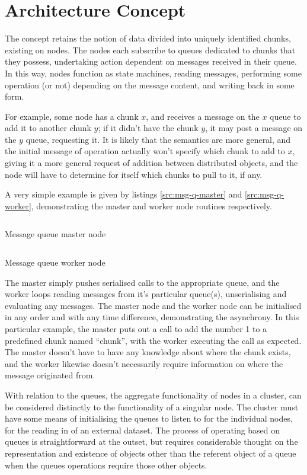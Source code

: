 \documentclass[a4paper,10pt]{article}
\begin{document}
\section{Architecture Concept}
The concept retains the notion of data divided into uniquely identified chunks,
existing on nodes.
The nodes each subscribe to queues dedicated to chunks that they possess,
undertaking action dependent on messages received in their queue.
In this way, nodes function as state machines, reading messages, performing
some operation (or not) depending on the message content, and writing back in
some form.

For example, some node has a chunk \(x\), and receives a message on the \(x\)
queue to add it to another chunk \(y\); if it didn't have the chunk \(y\), it
may post a message on the \(y\) queue, requesting it.
It is likely that the semantics are more general, and the initial message of
operation actually won't specify which chunk to add to \(x\), giving it a more
general request of addition between distributed objects, and the node will have
to determine for itself which chunks to pull to it, if any.

A very simple example is given by listings \ref{src:msg-q-master} and
\ref{src:msg-q-worker}, demonstrating the master and worker node routines
respectively.

\begin{listing}
\inputminted{r}{R/simple-msg-q-master.R}
	\caption{Message queue master node}
	\label{src:msg-q-master}
\end{listing}

\begin{listing}
\inputminted{r}{R/simple-msg-q-worker.R}
	\caption{Message queue worker node}
	\label{src:msg-q-worker}
\end{listing}

The master simply pushes serialised calls to the appropriate queue, and the
worker loops reading messages from it's particular queue(s), unserialising and
evaluating any messages.
The master node and the worker node can be initialised in any order and with
any time difference, demonstrating the asynchrony.
In this particular example, the master puts out a call to add the number 1 to a
predefined chunk named ``chunk'', with the worker executing the call as
expected.
The master doesn't have to have any knowledge about where the chunk exists, and
the worker likewise doesn't necessarily require information on where the
message originated from.

With relation to the queues, the aggregate functionality of nodes in a cluster,
can be considered distinctly to the functionality of a singular node.  
The cluster must have some means of initialising the queues to listen to for
the individual nodes, for the reading in of an external dataset.
The process of operating based on queues is straightforward at the outset, but
requires considerable thought on the representation and existence of objects
other than the referent object of a queue when the queues operations require
those other objects.
\end{document}
